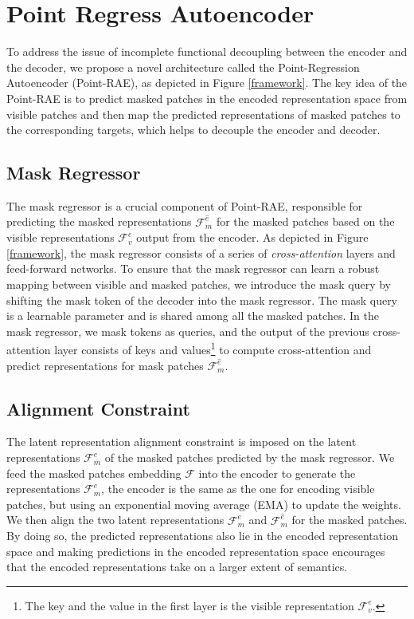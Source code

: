 \documentclass[sigconf, screen]{acmart}
\begin{document}
\section{Point Regress Autoencoder}
To address the issue of incomplete functional decoupling between the encoder and the decoder, we propose a novel architecture called the Point-Regression Autoencoder (Point-RAE), as depicted in Figure \ref{framework}.
The key idea of the Point-RAE is to predict masked patches in the encoded representation space from visible patches and then map the predicted representations of masked patches to the corresponding targets, which helps to decouple the encoder and decoder.

\subsection{Mask Regressor}
The mask regressor is a crucial component of Point-RAE, responsible for predicting the masked representations $\mathcal{F}_m^{\hat{e}}$ for the masked patches based on the visible representations $\mathcal{F}_v^e$ output from the encoder.
As depicted in Figure \ref{framework}, the mask regressor consists of a series of \textit{cross-attention} layers and feed-forward networks.
To ensure that the mask regressor can learn a robust mapping between visible and masked patches, we introduce the mask query by shifting the mask token of the decoder into the mask regressor. The mask query is a learnable parameter and is shared among all the masked patches. 
In the mask regressor, we mask tokens as queries, and the output of the previous cross-attention layer consists of keys and values\footnote{The key and the value in the first layer is the visible representation $\mathcal{F}_{v}^e$.} to compute cross-attention and predict representations for mask patches $\mathcal{F}_{m}^{\hat{e}}$.

\subsection{Alignment Constraint}
The latent representation alignment constraint is imposed on the latent representations $\mathcal{F}_m^{\hat{e}}$ of the masked patches predicted by the mask regressor. 
We feed the masked patches embedding $\mathcal{F}$ into the encoder to generate the representations $\mathcal{F}_m^e$, the encoder is the same as the one for encoding visible patches, but using an exponential moving average (EMA) to update the weights.
We then align the two latent representations $\mathcal{F}_m^e$ and $\mathcal{F}_m^{\hat{e}}$ for the masked patches.
By doing so, the predicted representations also lie in the encoded representation space and making predictions in the encoded representation space encourages that the encoded representations take on a larger extent of semantics.
\end{document}
